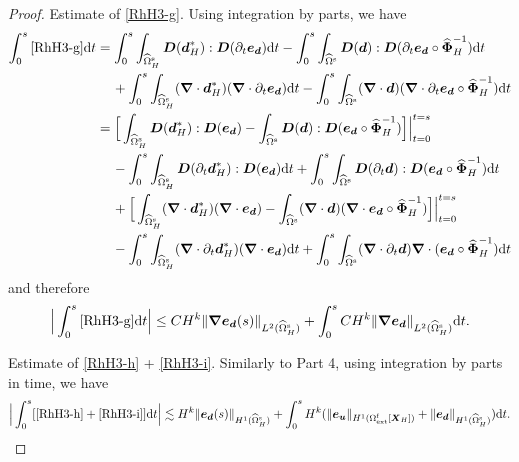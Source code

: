 \documentclass[11pt,reqno]{amsart}
\theoremstyle{definition}
\theoremstyle{plain}
\numberwithin{theorem}{section}
\numberwithin{proposition}{section}
\numberwithin{lemma}{section}
\numberwithin{equation}{section}
\newcommand{\bs}[1]{\boldsymbol{#1}}
\newcommand{\uu}[1]  {{\bs{#1}} }
\newcommand{\dep}{{{\bs{d}}}}
\newcommand{\grad}   { \uu{\nabla}    }
\def\d{\mathrm{d}}
\renewcommand{\(}{\bigl(}
\renewcommand{\)}{\bigr)}
\begin{document}
\begin{proof}
 Estimate of \eqref{RhH3-g}. Using integration by parts, we have 
\begin{align*}
\int_0^s\eqref{RhH3-g} \d t
&= \int_0^s\int_{\widehat{\Omega}^{\rm s}_H} {\bs D}(\dep_H^*) : {\bs D}(\partial_t{\bs e}_{\bs d}) \d t - \int_0^s\int_{\widehat{\Omega}^{\rm s}} {\bs D}(\dep) : {\bs D}(\partial_t{\bs e}_{\bs d} \circ \widehat{\bs\Phi}_H^{-1}) \d t \notag\\
&\quad\, + \int_0^s\int_{\widehat{\Omega}^{\rm s}_H} (\grad\cdot \dep_H^* ) (\grad\cdot \partial_t{\bs e}_{\bs d}) \d t - \int_0^s\int_{\widehat{\Omega}^{\rm s}} (\grad\cdot \dep) (\grad\cdot \partial_t{\bs e}_{\bs d} \circ \widehat{\bs\Phi}_H^{-1}) \d t \\
&= \Big[\int_{\widehat{\Omega}^{\rm s}_H} {\bs D}(\dep_H^*) : {\bs D}({\bs e}_{\bs d}) - \int_{\widehat{\Omega}^{\rm s}} {\bs D}(\dep) : {\bs D}({\bs e}_{\bs d} \circ \widehat{\bs\Phi}_H^{-1}) \Big]\Big|_{t=0}^{t=s} \\
&\quad\, - \int_0^s\int_{\widehat{\Omega}^{\rm s}_H} {\bs D}(\partial_t\dep_H^*) : {\bs D}({\bs e}_{\bs d}) \d t  + \int_0^s \int_{\widehat{\Omega}^{\rm s}} {\bs D}( \partial_t\dep) : {\bs D}({\bs e}_{\bs d} \circ \widehat{\bs\Phi}_H^{-1}) \d t \\
&\quad\, + \Big[\int_{\widehat{\Omega}^{\rm s}_H} (\grad\cdot \dep_H^*) (\grad \cdot{\bs e}_{\bs d}) - \int_{\widehat{\Omega}^{\rm s}} (\grad\cdot \dep) (\grad\cdot {\bs e}_{\bs d} \circ \widehat{\bs\Phi}_H^{-1}) \Big]\Big|_{t=0}^{t=s} \\
&\quad\, - \int_0^s\int_{\widehat{\Omega}^{\rm s}_H} (\grad\cdot\partial_t\dep_H^*) (\grad\cdot {\bs e}_{\bs d}) \d t  + \int_0^s \int_{\widehat{\Omega}^{\rm s}} (\grad\cdot \partial_t\dep)   \grad\cdot ({\bs e}_{\bs d} \circ \widehat{\bs\Phi}_H^{-1}) \d t 
\end{align*}
and therefore
\begin{align*}
\Big| \int_0^s\eqref{RhH3-g} \d t \Big| 
\le CH^k \| \grad{\bs e}_{\bs d}(s) \|_{L^2(\widehat{\Omega}^{\rm s}_H)} 
+ \int_0^s CH^k \| \grad {\bs e}_{\bs d} \|_{L^2(\widehat{\Omega}^{\rm s}_H)} \d t .
\end{align*}


 Estimate of \eqref{RhH3-h} + \eqref{RhH3-i}. Similarly to Part 4, using integration by parts in time, we have  
\begin{align*}
\Big|\int_0^s [\eqref{RhH3-h} + \eqref{RhH3-i}]\d t \Big|
\lesssim H^k \|{\bs e}_{\bs d}(s) \|_{H^1(\widehat{\Omega}^{\rm s}_H)} 
+ \int_0^s H^k (\| {\bs e}_{\bs u} \|_{H^1({\Omega}^{\rm f}_{\rm ext}[{\bs X}_H])} 
+ \| {\bs e}_{\bs d} \|_{H^1(\widehat{\Omega}^{\rm s}_H)} ) \d t .
\end{align*}


\end{proof}
\end{document}
